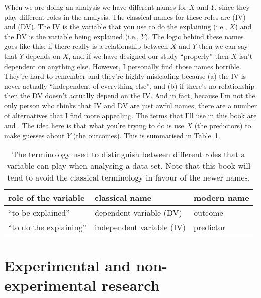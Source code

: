 When we are doing an analysis we have different names for $X$ and $Y$, since they play different roles in the analysis. The classical names for these roles are  (IV) and  (DV). The IV is the variable that you use to do the explaining (i.e., $X$) and the DV is the variable being explained (i.e., $Y$). The logic behind these names goes like this: if there really is a relationship between $X$ and $Y$ then we can say that $Y$ depends on $X$, and if we have designed our study ``properly'' then $X$ isn't dependent on anything else. However, I personally find those names horrible. They're hard to remember and they're highly misleading because (a) the IV is never actually ``independent of everything else'', and (b) if there's no relationship then the DV doesn't actually depend on the IV. And in fact, because I'm not the only person who thinks that IV and DV are just awful names, there are a number of alternatives that I find more appealing. The terms that I'll use in this book are  and . The idea here is that what you're trying to do is use $X$ (the predictors) to make guesses about $Y$ (the outcomes). This is summarised in Table~\ref{tab:ivdv}.

\begin{table}
\caption{The terminology used to distinguish between different roles that a variable can play when analysing a data set. Note that this book will tend to avoid the classical terminology in favour of the newer names.} \label{tab:ivdv} \tabcapsep
\begin{center}
\begin{tabular}{l|ll}
role of the variable & classical name & modern name  \\ \hline
``to be explained'' & dependent variable (DV) & outcome \\
``to do the explaining'' & independent variable (IV) & predictor \\ 
\end{tabular} 
\tabcapsep \HR
\end{center}
\end{table}


\section{Experimental and non-experimental research~\label{sec:researchdesigns}}

